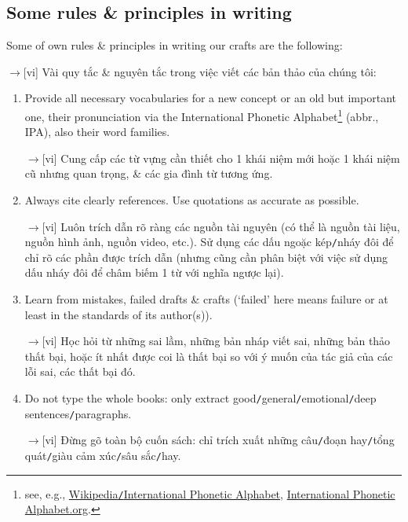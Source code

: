 \documentclass[12pt,oneside]{book}
\begin{document}
\subsection{Some rules \& principles in writing}
Some of own rules \& principles in writing our crafts are the following:

{\sf[en]$\to$[vi]} Vài quy tắc \& nguyên tắc trong việc viết các bản thảo của chúng tôi:
\begin{enumerate}
	\item Provide all necessary vocabularies for a new concept or an old but important one, their pronunciation via the International Phonetic Alphabet\footnote{see, e.g., \href{https://en.wikipedia.org/wiki/International_Phonetic_Alphabet}{Wikipedia{\tt/}International Phonetic Alphabet}, \href{https://www.internationalphoneticalphabet.org/}{International Phonetic Alphabet.org}.} (abbr., IPA), also their word families.
	
	{\sf[en]$\to$[vi]} Cung cấp các từ vựng cần thiết cho 1 khái niệm mới hoặc 1 khái niệm cũ nhưng quan trọng, \& các gia đình từ tương ứng.
	\item Always cite clearly references. Use quotations as accurate as possible.
	
	{\sf[en]$\to$[vi]} Luôn trích dẫn rõ ràng các nguồn tài nguyên (có thể là nguồn tài liệu, nguồn hình ảnh, nguồn video, etc.). Sử dụng các dấu ngoặc kép{\tt/}nháy đôi để chỉ rõ các phần được trích dẫn (nhưng cũng cần phân biệt với việc sử dụng dấu nháy đôi để châm biếm 1 từ với nghĩa ngược lại).
	\item Learn from mistakes, failed drafts \& crafts (`failed' here means failure or at least in the standards of its author(s)).
	
	{\sf[en]$\to$[vi]} Học hỏi từ những sai lầm, những bản nháp viết sai, những bản thảo thất bại, hoặc ít nhất được coi là thất bại so với ý muốn của tác giả của các lỗi sai, các thất bại đó.
	\item Do not type the whole books: only extract good{\tt/}general{\tt/}emotional{\tt/}deep sentences{\tt/}paragraphs.
	
	{\sf[en]$\to$[vi]} Đừng gõ toàn bộ cuốn sách: chỉ trích xuất những câu{\tt/}đoạn hay{\tt/}tổng quát{\tt/}giàu cảm xúc{\tt/}sâu sắc{\tt/}hay.
\end{enumerate}
\end{document}
